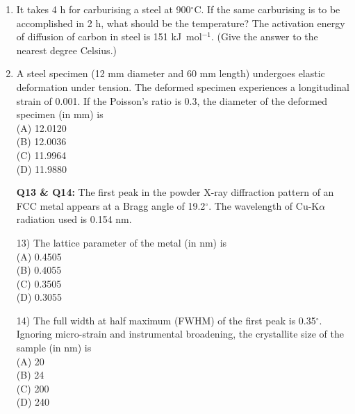 \documentclass[journal,12pt,onecolumn]{IEEEtran}
\begin{document}
\begin{enumerate}
\item It takes 4 h for carburising a steel at 900$^\circ$C. If the same carburising is to be accomplished in 2 h, what should be the temperature? The activation energy of diffusion of carbon in steel is 151 kJ~mol$^{-1}$.
(Give the answer to the nearest degree Celsius.)
\vspace{0.2cm}
\hfill{}\\
\vspace{0.5cm}

\item A steel specimen (12 mm diameter and 60 mm length) undergoes elastic deformation under tension. The deformed specimen experiences a longitudinal strain of 0.001. If the Poisson's ratio is 0.3, the diameter of the deformed specimen (in mm) is
\vspace{0.2cm}
\hfill{}\\
(A) 12.0120 \\
(B) 12.0036 \\
(C) 11.9964 \\
(D) 11.9880
\vspace{0.5cm}

\newpage

\item[\textbf{Q13 \& Q14:}] The first peak in the powder X-ray diffraction pattern of an FCC metal appears at a Bragg angle of 19.2$^{\circ}$. The wavelength of Cu-K$\alpha$ radiation used is 0.154 nm.
\vspace{0.5cm}

\item[13)] The lattice parameter of the metal (in nm) is
\vspace{0.2cm}
\hfill{}\\
(A) 0.4505 \\
(B) 0.4055 \\
(C) 0.3505 \\
(D) 0.3055
\vspace{0.5cm}

\item[14)] The full width at half maximum (FWHM) of the first peak is 0.35$^{\circ}$. Ignoring micro-strain and instrumental broadening, the crystallite size of the sample (in nm) is
\vspace{0.2cm}
\hfill{}\\
(A) 20 \\
(B) 24 \\
(C) 200 \\
(D) 240
\vspace{0.5cm}


\end{enumerate}
\end{document}
